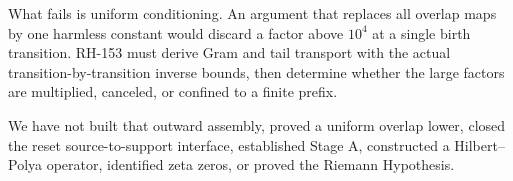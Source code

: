 \documentclass[12pt]{article}
\begin{document}
What fails is uniform conditioning.  An argument that replaces all overlap
maps by one harmless constant would discard a factor above $10^4$ at a single
birth transition.  RH-153 must derive Gram and tail transport with the
actual transition-by-transition inverse bounds, then determine whether the
large factors are multiplied, canceled, or confined to a finite prefix.

We have not built that outward assembly, proved a uniform overlap lower,
closed the reset source-to-support interface, established Stage A,
constructed a Hilbert--Polya operator, identified zeta zeros, or proved the
Riemann Hypothesis.



\end{document}
